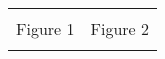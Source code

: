 \begin{table}[!ht]
\begin{tabu}{X[1,c] X[1,c]}
\begin{kormanize}
\end{kormanize}

&

\begin{kormanize}
\end{kormanize}

\\

\hspace{1.5em} Figure 1

&

\hspace{1.5em} Figure 2

\\

\begin{kormanize}
\end{kormanize}

&

\begin{kormanize}
\end{kormanize}


\end{tabu}
\end{table}
